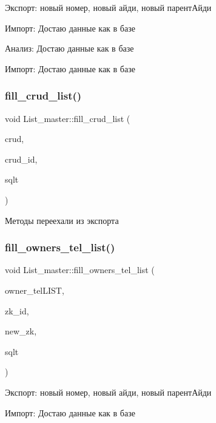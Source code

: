 Экспорт\+: новый номер, новый айди, новый парентАйди

Импорт\+: Достаю данные как в базе

Анализ\+: Достаю данные как в базе

Импорт\+: Достаю данные как в базе \mbox{\label{class_list__master_a548dab388e4d2c705242c316617b1271}} 
\subsubsection{\texorpdfstring{fill\_crud\_list()}{fill\_crud\_list()}}
{\footnotesize\ttfamily void List\+\_\+master\+::fill\+\_\+crud\+\_\+list (\begin{DoxyParamCaption}\item[{Q\+List$<$ \mbox{\hyperlink{class_crud}{Crud}} $\ast$ $>$ $\ast$}]{crud,  }\item[{int}]{crud\+\_\+id,  }\item[{Sql\+Type}]{sqlt }\end{DoxyParamCaption})}

Методы переехали из экспорта \mbox{\label{class_list__master_a57d25edc739caf7fd551b857c5a9cb78}} 
\subsubsection{\texorpdfstring{fill\_owners\_tel\_list()}{fill\_owners\_tel\_list()}}
{\footnotesize\ttfamily void List\+\_\+master\+::fill\+\_\+owners\+\_\+tel\+\_\+list (\begin{DoxyParamCaption}\item[{Q\+List$<$ \mbox{\hyperlink{class_owners__tel}{Owners\+\_\+tel}} $\ast$ $>$ $\ast$}]{owner\+\_\+tel\+L\+I\+ST,  }\item[{int}]{zk\+\_\+id,  }\item[{int}]{new\+\_\+zk,  }\item[{Sql\+Type}]{sqlt }\end{DoxyParamCaption})}

Экспорт\+: новый номер, новый айди, новый парентАйди

Импорт\+: Достаю данные как в базе

